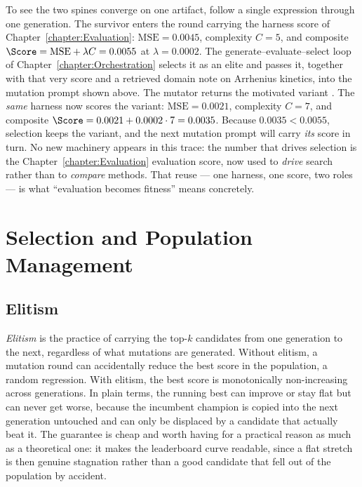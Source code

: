 \begin{example}
To see the two spines converge on one artifact, follow a single expression through one generation.
The survivor  enters the round carrying the harness score of Chapter~\ref{chapter:Evaluation}: $\mathrm{MSE} = 0.0045$, complexity $C = 5$, and composite $\Score = \mathrm{MSE} + \lambda C = 0.0055$ at $\lambda = 0.0002$.
The generate--evaluate--select loop of Chapter~\ref{chapter:Orchestration} selects it as an elite and passes it, together with that very score and a retrieved domain note on Arrhenius kinetics, into the mutation prompt shown above.
The mutator returns the motivated variant .
The \emph{same} harness now scores the variant: $\mathrm{MSE} = 0.0021$, complexity $C = 7$, and composite $\Score = 0.0021 + 0.0002 \cdot 7 = 0.0035$.
Because $0.0035 < 0.0055$, selection keeps the variant, and the next mutation prompt will carry \emph{its} score in turn.
No new machinery appears in this trace: the number that drives selection is the Chapter~\ref{chapter:Evaluation} evaluation score, now used to \emph{drive} search rather than to \emph{compare} methods.
That reuse --- one harness, one score, two roles --- is what ``evaluation becomes fitness'' means concretely.
\end{example}

\section{Selection and Population Management}
\label{section:Selection}

\subsection{Elitism}

\emph{Elitism} is the practice of carrying the top-$k$ candidates from one generation to the next, regardless of what mutations are generated.
Without elitism, a mutation round can accidentally reduce the best score in the population, a random regression.
With elitism, the best score is monotonically non-increasing across generations.
In plain terms, the running best can improve or stay flat but can never get worse, because the incumbent champion is copied into the next generation untouched and can only be displaced by a candidate that actually beat it.
The guarantee is cheap and worth having for a practical reason as much as a theoretical one: it makes the leaderboard curve readable, since a flat stretch is then genuine stagnation rather than a good candidate that fell out of the population by accident.


